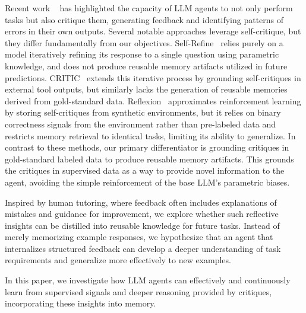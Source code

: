 Recent work ~\cite{NEURIPS2023_91edff07,yao2023react,gou2024critic,NEURIPS2023_1b44b878, zhang2025spiralsymbolicllmplanning} has highlighted the capacity of LLM agents to not only perform tasks but also critique them, generating feedback and identifying patterns of errors in their own outputs. Several notable approaches leverage self-critique, but they differ fundamentally from our objectives. Self-Refine~\cite{NEURIPS2023_91edff07} relies purely on a model iteratively refining its response to a single question using parametric knowledge, and does not produce reusable memory artifacts utilized in future predictions. CRITIC~\cite{gou2024critic} extends this iterative process by grounding self-critiques in external tool outputs, but similarly lacks the generation of reusable memories derived from gold-standard data. Reflexion~\cite{NEURIPS2023_1b44b878} approximates reinforcement learning by storing self-critiques from synthetic environments, but it relies on binary correctness signals from the environment rather than pre-labeled data and restricts memory retrieval to identical tasks, limiting its ability to generalize. In contrast to these methods, our primary differentiator is grounding critiques in gold-standard labeled data to produce reusable memory artifacts. This grounds the critiques in supervised data as a way to provide novel information to the agent, avoiding the simple reinforcement of the base LLM's parametric biases.  

Inspired by human tutoring, where feedback often includes explanations of mistakes and guidance for improvement, we explore whether such reflective insights can be distilled into reusable knowledge for future tasks. Instead of merely memorizing example responses, we hypothesize that an agent that internalizes structured feedback can develop a deeper understanding of task requirements and generalize more effectively to new examples.

In this paper, we investigate how LLM agents can effectively and continuously learn from supervised signals and deeper reasoning provided by critiques, incorporating these insights into memory. 
